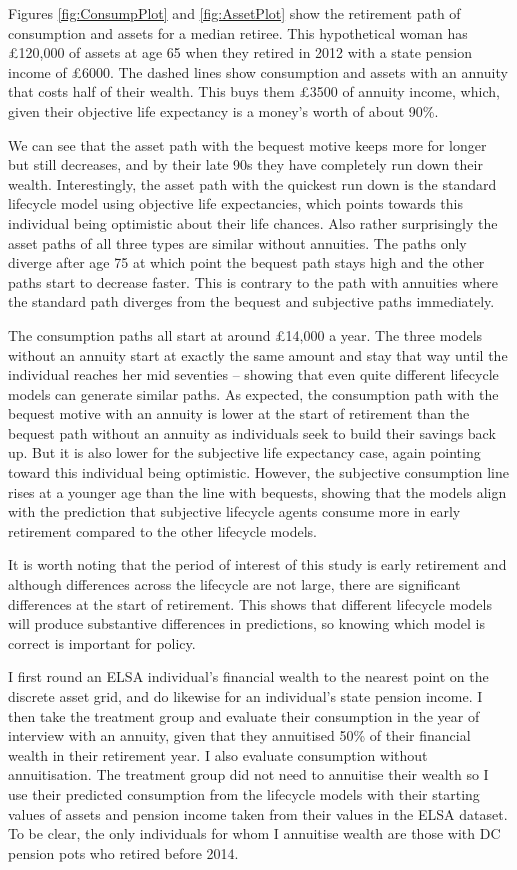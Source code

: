 \documentclass[12pt]{article}
\begin{document}
Figures \ref{fig:ConsumpPlot} and \ref{fig:AssetPlot} show the retirement path
of consumption and assets for a median retiree. This hypothetical woman has
£120,000 of assets at age 65 when they retired in 2012 with a state pension
income of £6000. The dashed lines show consumption and assets with an annuity
that costs half of their wealth. This buys them £3500 of annuity income, which,
given their objective life expectancy is a money's worth of about 90\%.

We can see that the asset path with the bequest motive keeps more for longer but
still decreases, and by their late 90s they have completely run down their
wealth. Interestingly, the asset path with the quickest run down is the standard
lifecycle model using objective life expectancies, which points towards this
individual being optimistic about their life chances. Also rather surprisingly
the asset paths of all three types are similar without annuities. The paths only
diverge after age 75 at which point the bequest path stays high and the other
paths start to decrease faster. This is contrary to the path with annuities
where the standard path diverges from the bequest and subjective paths
immediately.

The consumption paths all start at around £14,000 a year. The three models without an
annuity start at exactly the same amount and stay that way until the individual
reaches her mid seventies -- showing that even quite different lifecycle models
can generate similar paths. As expected, the consumption path with the bequest
motive with an annuity is lower at the start of retirement than the bequest path
without an annuity as individuals seek to build their savings back up. But it is
also lower for the subjective life expectancy case, again pointing toward this
individual being optimistic. However, the subjective consumption line rises at a
younger age than the line with bequests, showing that the models align with the
prediction that subjective lifecycle agents consume more in early retirement
compared to the other lifecycle models.

It is worth noting that the period of interest of this study is early retirement
and although differences across the lifecycle are not large, there are
significant differences at the start of retirement. This shows that different
lifecycle models will produce substantive differences in predictions, so knowing
which model is correct is important for policy.

I first round an ELSA individual's financial wealth to the nearest point on the
discrete asset grid, and do likewise for an individual's state pension income. I
then take the treatment group and evaluate their consumption in the year of
interview with an annuity, given that they annuitised 50\% of their financial
wealth in their retirement year. I also evaluate consumption without
annuitisation. The treatment group did not need to annuitise their wealth so I
use their predicted consumption from the lifecycle models with their starting
values of assets and pension income taken from their values in the ELSA dataset.
To be clear, the only individuals for whom I annuitise wealth are those with DC
pension pots who retired before 2014.
\end{document}
